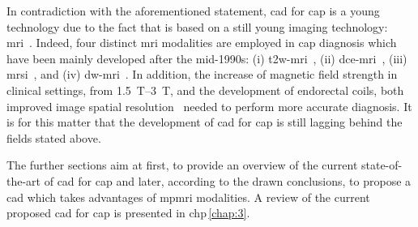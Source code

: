 In contradiction with the aforementioned statement, \ac{cad} for \ac{cap} is a
young technology due to the fact that is based on a still young imaging
technology: \ac{mri}~\cite{Hegde2013}.
Indeed, four distinct \ac{mri} modalities are employed in \ac{cap} diagnosis
which have been mainly developed after the mid-1990s: (i)
\ac{t2w}-\ac{mri}~\cite{Hricak1983}, (ii)
\ac{dce}-\ac{mri}~\cite{HuchBoni1995}, (iii) \ac{mrsi}~\cite{Kurhanewicz1996},
and (iv) \ac{dw}-\ac{mri}~\cite{Scheidler1999}.
In addition, the increase of magnetic field strength in clinical settings, from
\SIrange{1.5}{3}{\tesla}, and the development of endorectal coils, both
improved image spatial resolution~\cite{Swanson2001} needed to perform more
accurate diagnosis.
It is for this matter that the development of \ac{cad} for \ac{cap} is still
lagging behind the fields stated above.

The further sections aim at first, to provide an overview of the current
state-of-the-art of \ac{cad} for \ac{cap} and later, according to the drawn
conclusions, to propose a \ac{cad} which takes advantages of \ac{mpmri}
modalities.
A review of the current proposed \ac{cad} for \ac{cap} is presented in
\acs{chp}\,\ref{chap:3}.
